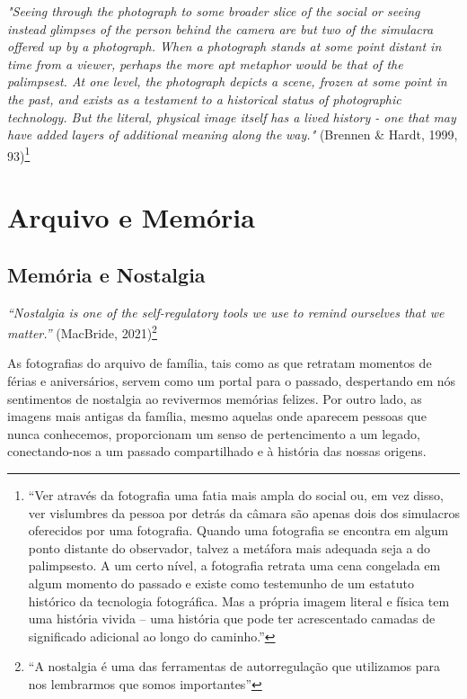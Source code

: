 \documentclass{article}
\begin{document}
\textit{"Seeing through the photograph to some broader slice of the social or seeing instead }
\textit{glimpses of the person behind the camera are but two of the simulacra offered up by a }
\textit{photograph. When a photograph stands at some point distant in time from a viewer, }
\textit{perhaps the more apt metaphor would be that of the palimpsest. At one level, the }
\textit{photograph depicts a scene, frozen at some point in the past, and exists as a testament }
\textit{to a historical status of photographic technology. But the literal, physical image itself }
\textit{has a lived history - one that may have added layers of additional meaning along the }
\textit{way." }(Brennen \& Hardt, 1999, 93)\footnote{“Ver através da fotografia uma fatia mais ampla do social ou, em vez disso, ver vislumbres da pessoa por detrás da câmara são apenas dois dos simulacros oferecidos por uma fotografia. Quando uma fotografia se encontra em algum ponto distante do observador, talvez a metáfora mais adequada seja a do palimpsesto. A um certo nível, a fotografia retrata uma cena congelada em algum momento do passado e existe como testemunho de um estatuto histórico da tecnologia fotográfica. Mas a própria imagem literal e física tem uma história vivida – uma história que pode ter acrescentado camadas de significado adicional ao longo do caminho.” } 
 
 
 

 


\section{Arquivo e Memória  }
\subsection{{{Memória e Nostalgia }}}
 
\textit{“Nostalgia is one of the self-regulatory tools we use to remind ourselves that we }
\textit{matter.” }(MacBride, 2021)\footnote{“A nostalgia é uma das ferramentas de autorregulação que utilizamos para nos lembrarmos que somos importantes” } 

 
As  fotografias  do  arquivo  de  família,  tais  como  as  que  retratam  momentos  de 
férias  e  aniversários,  servem  como  um  portal  para  o  passado,  despertando  em  nós 
sentimentos de nostalgia ao revivermos memórias felizes. Por outro lado, as imagens mais 
antigas  da  família,  mesmo  aquelas  onde  aparecem  pessoas  que  nunca  conhecemos, 
proporcionam um senso de pertencimento a um legado, conectando-nos a um passado 
compartilhado e à história das nossas origens. 
 
\end{document}

